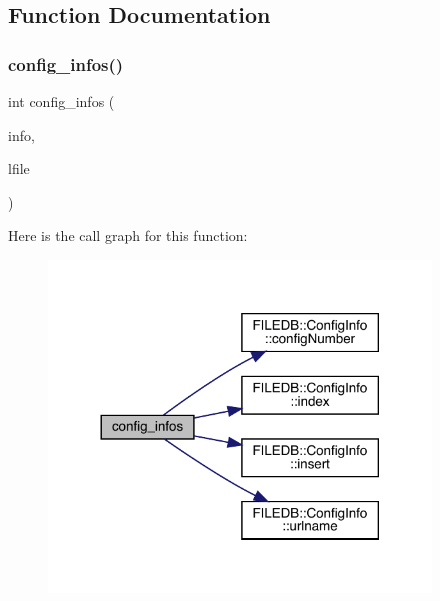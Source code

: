 \subsection{Function Documentation}
\mbox{\label{adat-devel_2main_2dbutil_2dbmerge_8cc_aaa3cdbe7635762272a40e8dc7887778c}} 
\subsubsection{\texorpdfstring{config\_infos()}{config\_infos()}}
{\footnotesize\ttfamily int config\+\_\+infos (\begin{DoxyParamCaption}\item[{vector$<$ \mbox{\hyperlink{classFILEDB_1_1ConfigInfo}{Config\+Info}} $>$ \&}]{info,  }\item[{const string \&}]{lfile }\end{DoxyParamCaption})}

Here is the call graph for this function\+:
\nopagebreak
\begin{figure}[H]
\begin{center}
\leavevmode
\includegraphics[width=288pt]{db/d3c/adat-devel_2main_2dbutil_2dbmerge_8cc_aaa3cdbe7635762272a40e8dc7887778c_cgraph}
\end{center}
\end{figure}
\mbox{\label{adat-devel_2main_2dbutil_2dbmerge_8cc_a3c04138a5bfe5d72780bb7e82a18e627}} 
